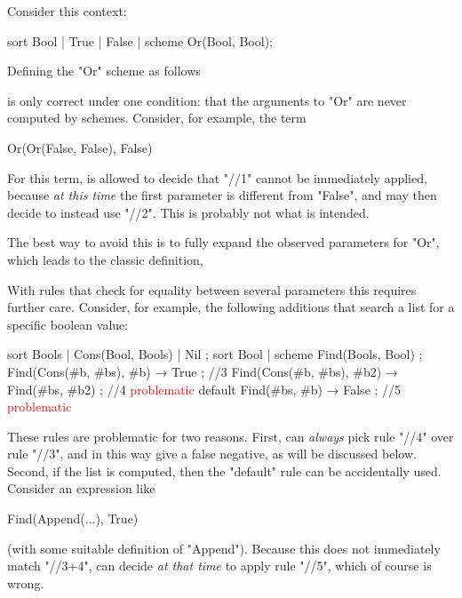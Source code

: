 \documentclass[12pt]{article} %
\begin{document}
Consider this context:
\begin{hacs}[xleftmargin=\parindent]
sort Bool | True | False | scheme Or(Bool, Bool);
\end{hacs}
Defining the "Or" scheme as follows
is only correct under one condition: that the arguments to "Or" are never computed by
schemes. Consider, for example, the term
\begin{hacs}[xleftmargin=\parindent]
Or(Or(False, False), False)
\end{hacs}
For this term, \HAX is allowed to decide that "//1" cannot be immediately applied, because \emph{at
  this time} the first parameter is different from "False", and \HAX may then decide to instead use
"//2". This is probably not what is intended.

The best way to avoid this is to fully expand the observed parameters for "Or", which leads to the
classic definition,
With rules that check for equality between several parameters this requires further care. Consider,
for example, the following additions that search a list for a specific boolean value:
\begin{hacs}[texcl,xleftmargin=\parindent]
sort Bools | Cons(Bool, Bools) | Nil ;
sort Bool | scheme Find(Bools, Bool) ;
Find(Cons(#b, #bs), #b) → True ;                      //3
Find(Cons(#b, #bs), #b2) → Find(#bs, #b2) ;         //4 \textcolor{red}{problematic}
default Find(#bs, #b) → False ;                         //5 \textcolor{red}{problematic}
\end{hacs}
These rules are problematic for two reasons. First, \HAX can \emph{always} pick rule "//4" over rule
"//3", and in this way give a false negative, as will be discussed below. Second, if the list is
computed, then the "default" rule can be accidentally used. Consider an expression like
\begin{hacs}[xleftmargin=\parindent]
Find(Append(...), True)
\end{hacs}
(with some suitable definition of "Append"). Because this does not immediately match "//3+4", \HAX
can decide \emph{at that time} to apply rule "//5", which of course is wrong.
\end{document}
